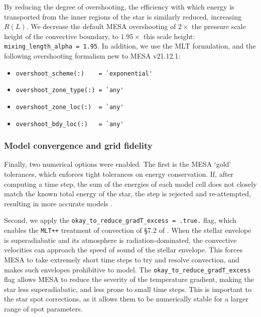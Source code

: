 By reducing the degree of overshooting, the efficiency with which energy is transported from the inner regions of the star is similarly reduced, increasing $R(L)$. We decrease the default MESA overshooting of $2\times$ the pressure scale height of the convective boundary, to $1.95\times$ this scale height: \lstinline{mixing_length_alpha = 1.95}. In addition, we use the \citet{henyay1965} MLT formulation, and the following overshooting formalism new to MESA v21.12.1:
\begin{itemize}
    \setlength\itemsep{0em}
    \item \lstinline{overshoot_scheme(:)    = `exponential'}
    \item \lstinline{overshoot_zone_type(:) = `any'}
    \item \lstinline{overshoot_zone_loc(:)  = `any'}
    \item \lstinline{overshoot_bdy_loc(:)   = `any'}
\end{itemize}


\subsubsection{Model convergence and grid fidelity}

Finally, two numerical options were enabled.
The first is the MESA `gold' tolerances, which enforces tight tolerances on energy conservation.
If, after computing a time step, the sum of the energies of each model cell does not closely match the known total energy of the star, the step is rejected and re-attempted, resulting in more accurate models \citep{paxton2019}.

Second, we apply the \lstinline{okay_to_reduce_gradT_excess = .true.} flag, which enables the \lstinline{MLT++} treatment of convection of \S7.2 of \citet{paxton2013}.
When the stellar envelope is superadiabatic and its atmosphere is radiation-dominated, the convective velocities can approach the speed of sound of the stellar envelope. This forces MESA to take extremely short time steps to try and resolve convection, and makes such envelopes prohibitive to model. The \lstinline{okay_to_reduce_gradT_excess} flag allows MESA to reduce the severity of the temperature gradient, making the star less superadiabatic, and less prone to small time steps. This is important to the star spot corrections, as it allows them to be numerically stable for a larger range of spot parameters.


